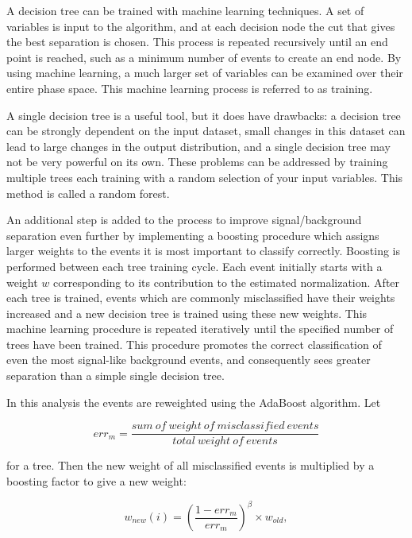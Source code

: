 
A decision tree can be trained with machine learning techniques. A set of variables is input to the algorithm, and at each decision node the cut that gives the best separation is chosen. This process is repeated recursively until an end point is reached, such as a minimum number of events to create an end node. By using machine learning, a much larger set of variables can be examined over their entire phase space. This machine learning process is referred to as training.

A single decision tree is a useful tool, but it does have drawbacks: a decision tree can be strongly dependent on the input dataset, small changes in this dataset can lead to large changes in the output distribution, and a single decision tree may not be very powerful on its own. These problems can be addressed by training multiple trees each training with a random selection of your input variables. This method is called a random forest.

An additional step is added to the process to improve signal/background separation even further by implementing a boosting procedure which assigns larger weights to the events it is most important to classify correctly. Boosting is performed between each tree training cycle. Each event initially starts with a weight $w$ corresponding to its contribution to the estimated normalization. After each tree is trained, events which are commonly misclassified have their weights increased and a new decision tree is trained using these new weights. This machine learning procedure is repeated iteratively until the specified number of trees have been trained. This procedure promotes the correct classification of even the most signal-like background events, and consequently sees greater separation than a simple single decision tree. 

In this analysis the events are reweighted using the AdaBoost algorithm. Let 

\begin{equation}
err_m = \frac{sum\ of\ weight\ of\ misclassified\ events}{total\ weight\ of\ events}
\end{equation}

\noindent
for a tree. Then the new weight of all misclassified events is multiplied by a boosting factor to give a new weight:

\begin{equation}
w_{new}(i) = \left(\frac{1-err_m}{err_m}\right)^\beta  \times w_{old},
\end{equation}

